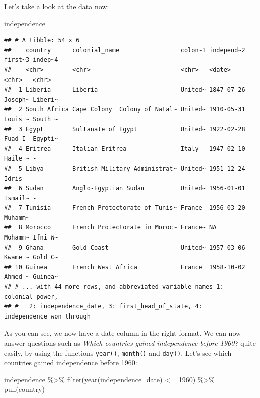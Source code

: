 \documentclass[
]{article}
\newenvironment{Shaded}{\begin{snugshade}}{\end{snugshade}}
\newcommand{\DecValTok}[1]{\textcolor[rgb]{0.00,0.00,0.81}{#1}}
\newcommand{\FunctionTok}[1]{\textcolor[rgb]{0.00,0.00,0.00}{#1}}
\newcommand{\NormalTok}[1]{#1}
\newcommand{\SpecialCharTok}[1]{\textcolor[rgb]{0.00,0.00,0.00}{#1}}
\begin{document}
Let's take a look at the data now:

\begin{Shaded}
\begin{Highlighting}[]
\NormalTok{independence}
\end{Highlighting}
\end{Shaded}

\begin{verbatim}
## # A tibble: 54 x 6
##    country      colonial_name                 colon~1 independ~2 first~3 indep~4
##    <chr>        <chr>                         <chr>   <date>     <chr>   <chr>  
##  1 Liberia      Liberia                       United~ 1847-07-26 Joseph~ Liberi~
##  2 South Africa Cape Colony  Colony of Natal~ United~ 1910-05-31 Louis ~ South ~
##  3 Egypt        Sultanate of Egypt            United~ 1922-02-28 Fuad I  Egypti~
##  4 Eritrea      Italian Eritrea               Italy   1947-02-10 Haile ~ -      
##  5 Libya        British Military Administrat~ United~ 1951-12-24 Idris   -      
##  6 Sudan        Anglo-Egyptian Sudan          United~ 1956-01-01 Ismail~ -      
##  7 Tunisia      French Protectorate of Tunis~ France  1956-03-20 Muhamm~ -      
##  8 Morocco      French Protectorate in Moroc~ France~ NA         Mohamm~ Ifni W~
##  9 Ghana        Gold Coast                    United~ 1957-03-06 Kwame ~ Gold C~
## 10 Guinea       French West Africa            France  1958-10-02 Ahmed ~ Guinea~
## # ... with 44 more rows, and abbreviated variable names 1: colonial_power,
## #   2: independence_date, 3: first_head_of_state, 4: independence_won_through
\end{verbatim}

As you can see, we now have a date column in the right format. We can now answer questions such as
\emph{Which countries gained independence before 1960?} quite easily, by using the functions \texttt{year()},
\texttt{month()} and \texttt{day()}. Let's see which countries gained independence before 1960:

\begin{Shaded}
\begin{Highlighting}[]
\NormalTok{independence }\SpecialCharTok{\%\textgreater{}\%}
  \FunctionTok{filter}\NormalTok{(}\FunctionTok{year}\NormalTok{(independence\_date) }\SpecialCharTok{\textless{}=} \DecValTok{1960}\NormalTok{) }\SpecialCharTok{\%\textgreater{}\%}
  \FunctionTok{pull}\NormalTok{(country)}
\end{Highlighting}
\end{Shaded}
\end{document}
